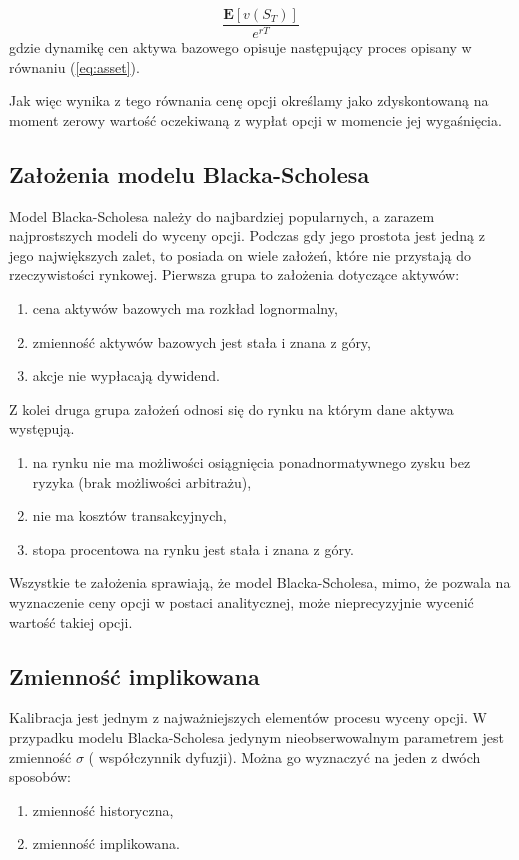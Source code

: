 \documentclass{pracamgr}
\begin{document}
\begin{equation}
\label{eq:discounting}
 \frac{\mathbf{E}[v(S_T)]}{e^{rT}}
\end{equation}
gdzie dynamikę cen aktywa bazowego opisuje następujący proces opisany w równaniu (\ref{eq:asset}).

Jak więc wynika z tego równania cenę opcji określamy jako zdyskontowaną na moment zerowy wartość
oczekiwaną z wypłat opcji w momencie jej wygaśnięcia. 

\subsection{Założenia modelu Blacka-Scholesa} %
\label{sub:zalozenia_modelu_blacka_scholesa}

Model Blacka-Scholesa należy do najbardziej popularnych, a zarazem najprostszych modeli do wyceny 
opcji. Podczas gdy jego prostota jest jedną z jego największych zalet, to posiada on wiele założeń,
które nie przystają do rzeczywistości rynkowej. Pierwsza grupa to założenia dotyczące aktywów:
\begin{enumerate}
\item cena aktywów bazowych ma rozkład lognormalny,
\item zmienność aktywów bazowych jest stała i znana z góry,
\item akcje nie wypłacają dywidend.
\end{enumerate}
Z kolei druga grupa założeń odnosi się do rynku na którym dane aktywa występują.
\begin{enumerate}
\item na rynku nie ma możliwości osiągnięcia ponadnormatywnego zysku bez ryzyka (brak możliwości arbitrażu),
\item nie ma kosztów transakcyjnych,
\item stopa procentowa na rynku jest stała i znana z góry.
\end{enumerate}

Wszystkie te założenia sprawiają, że model Blacka-Scholesa, mimo, że pozwala na wyznaczenie ceny
 opcji w postaci analitycznej, może nieprecyzyjnie wycenić wartość takiej opcji.
  
\subsection{Zmienność implikowana} %
\label{sub:zmienno_implikowana} 
Kalibracja jest jednym z najważniejszych elementów procesu wyceny opcji.
W przypadku modelu Blacka-Scholesa jedynym nieobserwowalnym parametrem jest zmienność $\sigma$ (
współczynnik dyfuzji). Można go wyznaczyć na jeden z dwóch sposobów:
\begin{enumerate}
  \item zmienność historyczna,
  \item zmienność implikowana.
\end{enumerate}
\end{document}

